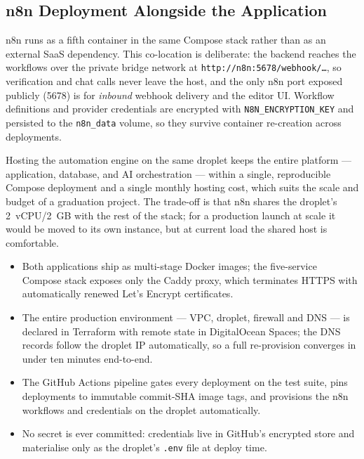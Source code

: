 \documentclass[12pt, a4paper, oneside]{report}
\newenvironment{keytakeaways}{%
  \par\bigskip
  \begin{mdframed}[
    backgroundcolor=cheebolightgray,
    linecolor=cheeboblue,
    linewidth=3pt,
    topline=false,
    bottomline=false,
    rightline=false,
    innerleftmargin=14pt,
    innerrightmargin=14pt,
    innertopmargin=10pt,
    innerbottommargin=10pt
  ]
  \noindent{\bfseries\color{cheeboblue}\large Key Takeaways}\par
  \vspace{4pt}
  \small
}{%
  \end{mdframed}
}
\begin{document}
\subsection{n8n Deployment Alongside the Application}

n8n runs as a fifth container in the same Compose stack rather than
as an external SaaS dependency. This co-location is deliberate: the
backend reaches the workflows over the private bridge network at
\texttt{http://n8n:5678/webhook/\dots}, so verification and chat
calls never leave the host, and the only n8n port exposed publicly
(5678) is for \emph{inbound} webhook delivery and the editor UI.
Workflow definitions and provider credentials are encrypted with
\texttt{N8N\_ENCRYPTION\_KEY} and persisted to the \texttt{n8n\_data}
volume, so they survive container re-creation across deployments.

Hosting the automation engine on the same droplet keeps the entire
platform --- application, database, and AI orchestration --- within a
single, reproducible Compose deployment and a single monthly hosting
cost, which suits the scale and budget of a graduation project. The
trade-off is that n8n shares the droplet's 2~vCPU/2~GB with the rest
of the stack; for a production launch at scale it would be moved to
its own instance, but at current load the shared host is comfortable.

\begin{keytakeaways}
\begin{itemize}[leftmargin=*,itemsep=2pt]
  \item Both applications ship as multi-stage Docker images; the
        five-service Compose stack exposes only the Caddy proxy,
        which terminates HTTPS with automatically renewed
        Let's Encrypt certificates.
  \item The entire production environment --- VPC, droplet, firewall
        and DNS --- is declared in Terraform with remote state in
        DigitalOcean Spaces; the DNS records follow the droplet IP
        automatically, so a full re-provision converges in under ten
        minutes end-to-end.
  \item The GitHub Actions pipeline gates every deployment on the
        test suite, pins deployments to immutable commit-SHA image
        tags, and provisions the n8n workflows and credentials on
        the droplet automatically.
  \item No secret is ever committed: credentials live in GitHub's
        encrypted store and materialise only as the droplet's
        \texttt{.env} file at deploy time.
\end{itemize}
\end{keytakeaways}
\end{document}
